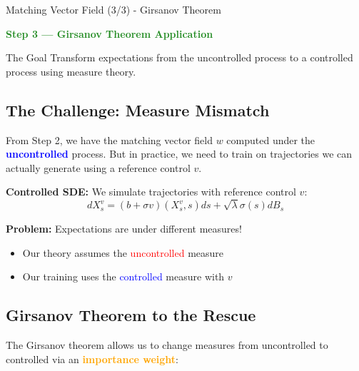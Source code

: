 \documentclass[aspectratio=169,xcolor=dvipsnames]{beamer}
\begin{document}
\begin{frame}[allowframebreaks]{Matching Vector Field (3/3) - Girsanov Theorem}

    \begin{center}
        \Large\textcolor{ForestGreen}{\textbf{Step 3 — Girsanov Theorem Application}}
    \end{center}
    
    \vspace{0.3cm}
    
    \begin{block}{The Goal}
        Transform expectations from the uncontrolled process to a controlled process using measure theory.
    \end{block}
    
    \vspace{0.5cm}
    
    \subsection*{The Challenge: Measure Mismatch}
    
    From Step 2, we have the matching vector field $w$ computed under the \textcolor{blue}{\textbf{uncontrolled}} process. But in practice, we need to train on trajectories we can actually generate using a reference control $v$.
    
    \textbf{Controlled SDE:} We simulate trajectories with reference control $v$:
    $$dX_s^v = (b + \sigma v)(X_s^v, s) ds + \sqrt{\lambda} \sigma(s) dB_s$$
    
    \textbf{Problem:} Expectations are under different measures!
    \begin{itemize}
        \item Our theory assumes the \textcolor{red}{uncontrolled} measure 
        \item Our training uses the \textcolor{blue}{controlled} measure with $v$
    \end{itemize}
    
    \vspace{0.8cm}
    
    \subsection*{Girsanov Theorem to the Rescue}
    
    The Girsanov theorem allows us to change measures from uncontrolled to controlled via an \textcolor{orange}{\textbf{importance weight}}:
    

\end{frame}
\end{document}
